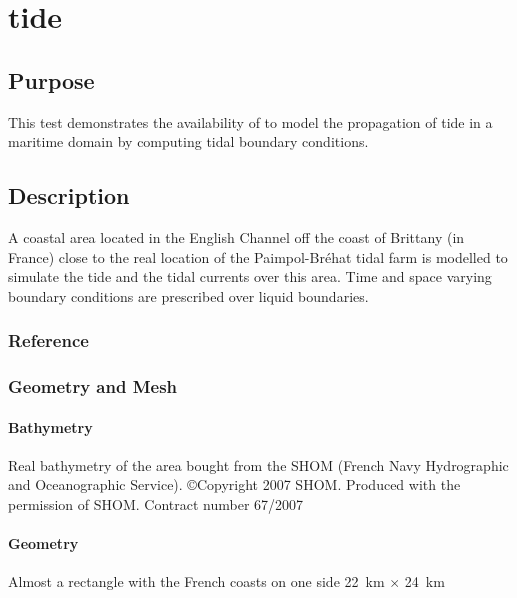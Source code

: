 \chapter{tide}
%
%
\section{Purpose}
%
This test demonstrates the availability of  to model the
propagation of tide in a maritime domain by computing tidal
boundary conditions.
%
\section{Description}
%
A coastal area located in the English Channel off the coast of
Brittany (in France) close to the real location of the Paimpol-Bréhat
tidal farm is modelled to simulate the tide and the tidal currents
over this area.
Time and space varying boundary conditions are prescribed over
liquid boundaries.
%
%
%
%
\subsection{Reference}
%

%
%
%
\subsection{Geometry and Mesh}
%
\subsubsection{Bathymetry}
%
Real bathymetry of the area bought from the SHOM (French Navy
Hydrographic and Oceanographic Service).
\copyright Copyright 2007 SHOM. Produced with the permission of SHOM.
Contract number 67/2007
%
\subsubsection{Geometry}
%
Almost a rectangle with the French coasts on one side
22~km $\times$ 24~km
%
